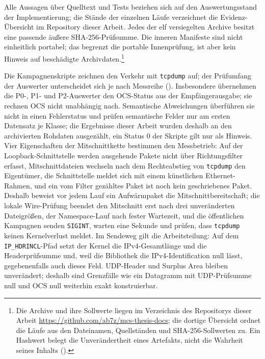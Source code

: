 Alle Aussagen über Quelltext und Tests beziehen sich auf den Auswertungsstand der Implementierung; die Stände der
einzelnen Läufe verzeichnet die Evidenz-Übersicht im Repository dieser Arbeit.
Jedes der elf versiegelten Archive besitzt eine passende äußere SHA-256-Prüfsumme. Die inneren Manifeste
sind nicht einheitlich portabel; das begrenzt
die portable Innenprüfung, ist aber kein Hinweis auf beschädigte Archivdaten.\footnote{Die
Archive und ihre Sollwerte liegen im Verzeichnis  des
Repositorys dieser Arbeit \url{https://github.com/ab7z/mcs-thesis-docs}; die dortige Übersicht ordnet die
Läufe aus  den Dateinamen, Quellständen und SHA-256-Sollwerten zu. Ein Hashwert belegt die
Unverändertheit eines Artefakts, nicht die Wahrheit seines Inhalts ().}

Die Kampagnenskripte zeichnen den Verkehr mit \texttt{tcpdump} auf; der Prüfumfang der Auswerter
unterscheidet sich je nach Messreihe (). Insbesondere übernehmen die
P0-, P1- und P2-Auswerter den OCS-Status aus der Empfänger\-ausgabe; sie rechnen OCS nicht unabhängig nach.
Semantische Abweichungen überführen sie nicht in einen Fehlerstatus und prüfen semantische Felder nur am ersten
Datensatz je Klasse; die Ergebnisse dieser Arbeit wurden deshalb an den archivierten Rohdaten ausgezählt, ein
Status 0 der Skripte gilt nur als Hinweis.
Vier Eigenschaften der Mitschnittkette bestimmen den Messbetrieb: Auf der Loopback-Schnittstelle
werden ausgehende Pakete nicht über Richtungsfilter erfasst, Mitschnittdateien wechseln nach dem Rechteabstieg von
\texttt{tcpdump} den Eigentümer, die Schnittstelle meldet sich mit einem künstlichen Ethernet-Rahmen, und
ein vom Filter gezähltes Paket ist noch kein geschriebenes Paket. Deshalb beweist vor jedem Lauf ein
Aufwärmpaket die Mitschnittbereitschaft; die lokale Wire-Prüfung beendet den Mitschnitt erst nach drei
unveränderten Datei\-größen, der Namespace-Lauf nach fester Wartezeit, und die öffentlichen Kampagnen senden
\texttt{SIGINT}, warten eine Sekunde und prüfen, dass \texttt{tcpdump} keinen Kernelverlust meldet. Im
Sendeweg gilt die Arbeitsteilung: Auf dem \texttt{IP\_HDRINCL}-Pfad
setzt der Kernel die IPv4-Gesamtlänge und die Header\-prüfsumme und, weil die Bibliothek die
IPv4-Identification null lässt, gegebenenfalls auch dieses Feld. UDP-Header und Surplus Area bleiben
unverändert; deshalb sind Grenz\-fälle
wie ein Datagramm mit UDP-Prüfsumme null und OCS null weiterhin exakt konstruierbar.

